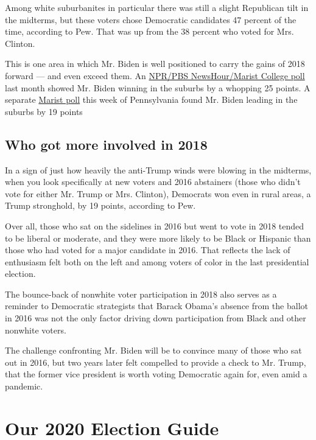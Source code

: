 Among white suburbanites in particular there was still a slight
Republican tilt in the midterms, but these voters chose Democratic
candidates 47 percent of the time, according to Pew. That was up from
the 38 percent who voted for Mrs. Clinton.

This is one area in which Mr. Biden is well positioned to carry the
gains of 2018 forward --- and even exceed them. An
\href{http://maristpoll.marist.edu/wp-content/uploads/2020/08/NPR_PBS-NewsHour_Marist-Poll_USA-NOS-and-TABLES_202008121039-1.pdf\#page=3}{NPR/PBS
NewsHour/Marist College poll} last month showed Mr. Biden winning in the
suburbs by a whopping 25 points. A separate
\href{http://maristpoll.marist.edu/wp-content/uploads/2020/09/NBC-News_Marist-Poll_PA-Likely-Voters_NOS-and-Tables_202009081145.pdf\#page=3}{Marist
poll} this week of Pennsylvania found Mr. Biden leading in the suburbs
by 19 points

\hypertarget{who-got-more-involved-in-2018}{%
\subsection{Who got more involved in
2018}\label{who-got-more-involved-in-2018}}

In a sign of just how heavily the anti-Trump winds were blowing in the
midterms, when you look specifically at new voters and 2016 abstainers
(those who didn't vote for either Mr. Trump or Mrs. Clinton), Democrats
won even in rural areas, a Trump stronghold, by 19 points, according to
Pew.

Over all, those who sat on the sidelines in 2016 but went to vote in
2018 tended to be liberal or moderate, and they were more likely to be
Black or Hispanic than those who had voted for a major candidate in
2016. That reflects the lack of enthusiasm felt both on the left and
among voters of color in the last presidential election.

The bounce-back of nonwhite voter participation in 2018 also serves as a
reminder to Democratic strategists that Barack Obama's absence from the
ballot in 2016 was not the only factor driving down participation from
Black and other nonwhite voters.

The challenge confronting Mr. Biden will be to convince many of those
who sat out in 2016, but two years later felt compelled to provide a
check to Mr. Trump, that the former vice president is worth voting
Democratic again for, even amid a pandemic.

\hypertarget{our-2020-election-guide}{%
\section{Our 2020 Election Guide}\label{our-2020-election-guide}}

